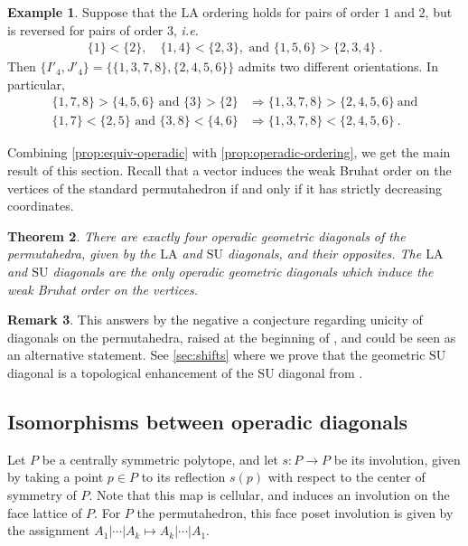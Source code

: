\documentclass{amsart}
\newcommand{\Guillaume}[1]{\todo[color=magenta!30]{\rm #1 \\ \hfill --- G.}}
\newtheorem{theorem}{Theorem}[section]
\theoremstyle{definition}
\newtheorem{example}[theorem]{Example}
\newtheorem{remark}[theorem]{Remark}
\renewcommand{\implies}{\Rightarrow} %
\newcommand{\ie}{\textit{i.e.}~} %
\newcommand{\SU}{\mathrm{SU}}
\newcommand{\LA}{\mathrm{LA}}
\begin{document}
\begin{example} 
\label{ex:Non-coherent order contradiction}
Suppose that the $\LA$ ordering holds for pairs of order $1$ and $2$, but is reversed for pairs of order $3$, \ie
\begin{align*}
    \{1\}<\{2\},\quad \{1,4\}< \{2,3\}, \text{ and } \{1, 5, 6 \} > \{2, 3, 4\} \ .
\end{align*}
Then $\{I'_4,J'_4\}=\{\{1, 3, 7, 8\}, \{2, 4, 5, 6\}\}$ admits two different orientations.
In particular, 
\begin{align*}
    \{1, 7, 8\} > \{ 4, 5, 6 \} \text{ and } \{3\} > \{2\} &\implies \{1, 3, 7, 8\} >\{2, 4, 5, 6\} \ \text{and} \\
    \{1, 7\}< \{2, 5\} \text{ and } \{3, 8\}< \{4, 6\} &\implies \{1, 3, 7, 8\} <\{2, 4, 5, 6\} \ .
\end{align*}
\end{example}

Combining \cref{prop:equiv-operadic} with \cref{prop:operadic-ordering}, we get the main result of this section.
Recall that a vector induces the weak Bruhat order on the vertices of the standard permutahedron if and only if it has strictly decreasing coordinates.\Guillaume{@Vincent: quoi citer?}

\begin{theorem}
\label{prop:unique-operad}
There are exactly four operadic geometric diagonals of the permutahedra, given by the $\LA$ and $\SU$ diagonals, and their opposites. 
The $\LA$ and $\SU$ diagonals are the only operadic geometric diagonals which induce the weak Bruhat order on the vertices.
\end{theorem}

\begin{remark}
This answers by the negative a conjecture regarding unicity of diagonals on the permutahedra, raised at the beginning of \cite[Sect.~3]{SaneblidzeUmble04}, and could be seen as an alternative statement. 
See \cref{sec:shifts} where we prove that the geometric $\SU$ diagonal is a topological enhancement of the $\SU$ diagonal from \cite{SaneblidzeUmble04}.
\end{remark}


\subsection{Isomorphisms between operadic diagonals}
\label{subsec:isos-LA-SU}

Let $P$ be a centrally symmetric polytope, and let $s : P \to P$ be its involution, given by taking a point $p \in P$ to its reflection $s(p)$ with respect to the center of symmetry of $P$. 
Note that this map is cellular, and induces an involution on the face lattice of $P$. 
For $P$ the permutahedron, this face poset involution is given by the assignment $A_1 | \cdots | A_k \mapsto A_k | \cdots | A_1$. 
\end{document}
